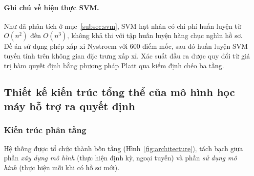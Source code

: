 \paragraph{Ghi chú về hiện thực SVM.} Như đã phân tích ở mục~\ref{subsec:svm},
SVM hạt nhân có chi phí huấn luyện từ $O(n^2)$ đến $O(n^3)$, không khả thi với
tập huấn luyện hàng chục nghìn hồ sơ. Đề án sử dụng phép xấp xỉ Nystroem với 600
điểm mốc, sau đó huấn luyện SVM tuyến tính trên không gian đặc trưng xấp xỉ. Xác
suất đầu ra được quy đổi từ giá trị hàm quyết định bằng phương pháp Platt qua
kiểm định chéo ba tầng.

\subsection{Thiết kế kiến trúc tổng thể của mô hình học máy hỗ trợ ra quyết định}
\label{subsec:kien-truc-tong-the}

\subsubsection{Kiến trúc phân tầng}

Hệ thống được tổ chức thành bốn tầng (Hình~\ref{fig:architecture}), tách bạch
giữa phần \textit{xây dựng mô hình} (thực hiện định kỳ, ngoại tuyến) và phần
\textit{sử dụng mô hình} (thực hiện mỗi khi có hồ sơ mới).

